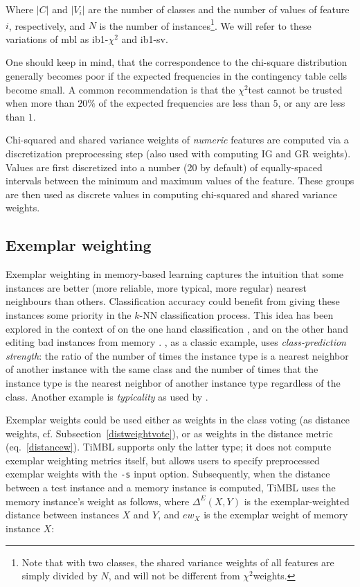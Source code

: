 \documentclass{report}
\newcommand{\chisq}{{$ \chi^2 $}}
\begin{document}
Where $|C|$ and $|V_{i}|$ are the number of classes and the number of
values of feature $i$, respectively, and $N$ is the number of
instances\footnote{Note that with two classes, the shared variance
weights of all features are simply divided by $N$, and will not be
different from \chisq weights.}. We will refer to these
variations of {\sc mbl} as {\sc ib1-\chisq} and {\sc ib1-sv}.

One should keep in mind, that the correspondence to the chi-square
distribution generally becomes poor if the expected frequencies in the
contingency table cells become small. A common recommendation is that
the \chisq test cannot be trusted when more than $20\%$ of the
expected frequencies are less than $5$, or any are less than $1$.

Chi-squared and shared variance weights of {\em numeric}\/ features are
computed via a discretization preprocessing step (also used with
computing IG and GR weights). Values are first discretized into a
number (20 by default) of equally-spaced intervals between the
minimum and maximum values of the feature. These groups are then used
as discrete values in computing chi-squared and shared variance weights.

\subsection{Exemplar weighting}
\label{exemplar}

Exemplar weighting in memory-based learning captures the intuition
that some instances are better (more reliable, more typical, more
regular) nearest neighbours than others. Classification accuracy could
benefit from giving these instances some priority in the $k$-NN
classification process. This idea has been explored in the context of
on the one hand classification \cite{Salzberg90,Zhang92}, and on the
other hand editing bad instances from memory
\cite{Aha+91}. , as a classic example, uses {\em
class-prediction strength}: the ratio of the number of times the
instance type is a nearest neighbor of another instance with the same
class and the number of times that the instance type is the nearest
neighbor of another instance type regardless of the class. Another
example is {\em typicality}\/ as used by .

Exemplar weights could be used either as weights in the class voting
(as distance weights, cf. Subsection~\ref{distweightvote}), or as
weights in the distance metric (eq.~\ref{distancew}). TiMBL supports
only the latter type; it does not compute exemplar weighting metrics
itself, but allows users to specify preprocessed exemplar weights with
the {\tt -s} input option. Subsequently, when the distance between a
test instance and a memory instance is computed, TiMBL uses the memory
instance's weight as follows, where $\Delta^{E}(X,Y)$ is the
exemplar-weighted distance between instances $X$ and $Y$, and $ew_{X}$
is the exemplar weight of memory instance $X$:
\end{document}

